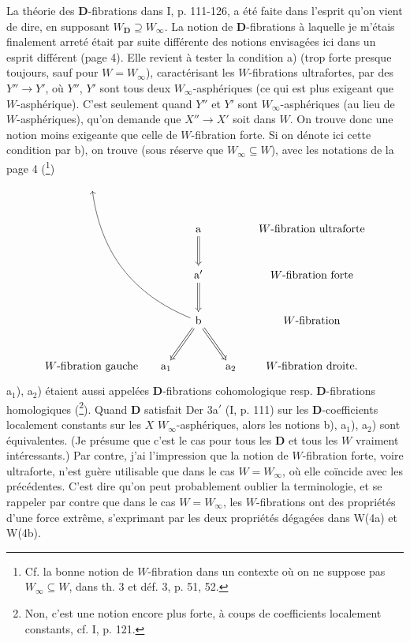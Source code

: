 \documentclass[11pt]{article}
\newcommand{\printedpage}[1]{\marginpar{\footnotesize p.~#1}}
\newcommand{\msp}[1]{\marginpar{\footnotesize [#1]}}
\begin{document}
La théorie des \textbf{D}-fibrations dans I, p. 111-126, a été faite dans l'esprit qu'on vient de dire, en supposant $W_{\mathbf{D}} \supseteq W_\infty$. La notion de \textbf{D}-fibrations à laquelle je m'étais finalement arreté était par suite différente des notions envisagées ici dans un esprit différent (page 4). Elle revient à tester la condition a) (trop forte presque toujours, sauf pour $W = W_\infty$), caractérisant les $W$-fibrations ultrafortes, par des $Y'' \longrightarrow Y'$, où $Y''$, $Y'$ sont tous deux $W_\infty$-asphériques (ce qui est plus exigeant que $W$-asphérique). C'est seulement quand $Y''$ et $Y'$ sont $W_\infty$-asphériques (au lieu de $W$-asphériques), qu'on demande que $X'' \longrightarrow X'$ soit dans $W$. On trouve donc\msp{page 19} une notion moins exigeante que celle de $W$-fibration forte. Si on dénote ici cette condition par b), on trouve (sous réserve que $W_\infty \subseteq W$), avec les notations de la page 4 (\footnote[39]{Cf. la bonne notion de $W$-fibration dans un contexte où on ne suppose pas $W_\infty \subseteq W$, dans th. 3 et déf. 3, p. 51, 52.}) %
\[
\begin{tikzcd}[column sep=small, row sep=large]
{} & & & & \\
& & \mathrm{a} \arrow[d, Rightarrow] & & W\text{-fibration ultraforte} \\
& & \mathrm{a}' \arrow[d, Rightarrow] & & W\text{-fibration forte} \\
& & \mathrm{b} \arrow[dl, Rightarrow] \arrow[dr, Rightarrow] \arrow[uuull, bend left=30] & & W\text{-fibration} \\
W\text{-fibration gauche} & \mathrm{a}_1 & & \mathrm{a}_2 & W\text{-fibration droite.}
\end{tikzcd}
\]
a$_1$), a$_2$) étaient aussi appelées \textbf{D}-fibrations cohomologique resp. \textbf{D}-fibrations homologiques (\footnote[40]{Non, c'est une notion encore plus forte, à coups de coefficients localement constants, cf. I, p. 121.}). Quand \textbf{D} satisfait Der 3a$'$ (I, p. 111) sur les \textbf{D}-coefficients localement constants sur les $X$ $W_\infty$-asphériques, alors les notions b), a$_1$), a$_2$) sont équivalentes. (Je présume que c'est le cas pour tous les \textbf{D} et tous les $W$ vraiment intéressants.) Par contre, j'ai l'impression que la notion de $W$-fibration forte, voire ultraforte, n'est guère utilisable que dans le cas $W = W_\infty$, où elle coïncide avec les précédentes. C'est dire qu'on peut probablement oublier la terminologie, et se rappeler par contre que dans le cas $W = W_\infty$, les %
\printedpage{17}
$W$-fibrations ont des propriétés d'une force extrême, s'exprimant par les deux propriétés dégagées dans W(4a) et W(4b).
\end{document}
